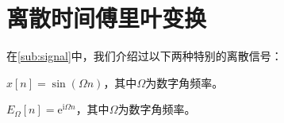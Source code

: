 \documentclass{ctexbook}
\begin{document}

\section{离散时间傅里叶变换}\label{sec:DTFT}

在\ref{sub:signal}中，我们介绍过以下两种特别的离散信号：

\begin{definition}[离散正弦信号]
    $x[n]=\sin(\Omega n)$，其中$\Omega$为数字角频率。
\end{definition}
\begin{definition}[离散复指数信号]
    $E_{\Omega}[n]=\mathrm{e}^{\mathrm{i}\Omega n}$，其中$\Omega$为数字角频率。
\end{definition}
\end{document}
